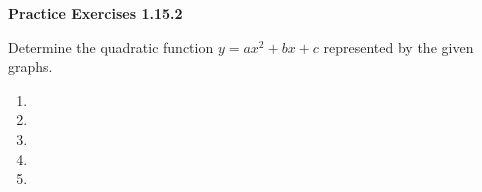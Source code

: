 \noindent\textbf{Practice Exercises 1.15.2}


Determine the quadratic function $y = ax^{2} + bx + c$ represented by the 
given graphs.
\begin{multicols}{3}
\begin{enumerate}[label = \color{blue}\arabic*. ]
\item {}
\item {}
\item {}
\item {} 
\item {}
\end{enumerate}
\end{multicols} 

